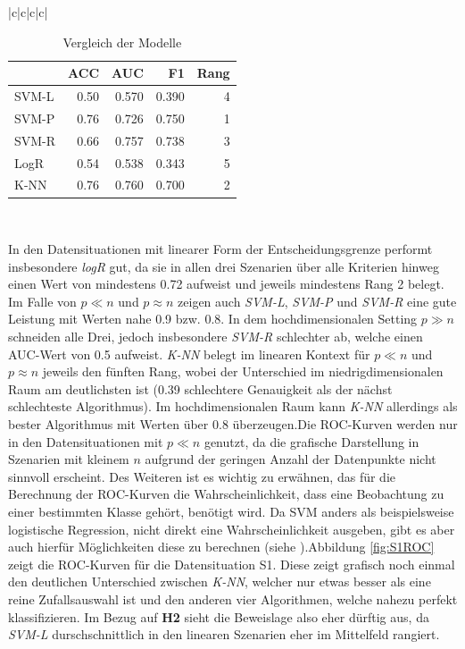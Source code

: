 \documentclass[
]{article}
\begin{document}
{\begin{landscape}
\begin{table}[h]
\begin{tabular}{|c|c|c|c|}
\begin{tabular}{lrrrr}
\toprule
  & ACC & AUC & F1 & Rang\\
\midrule
SVM-L & 0.50 & 0.570 & 0.390 & 4\\
SVM-P & 0.76 & 0.726 & 0.750 & 1\\
SVM-R & 0.66 & 0.757 & 0.738 & 3\\
LogR & 0.54 & 0.538 & 0.343 & 5\\
K-NN & 0.76 & 0.760 & 0.700 & 2\\
\bottomrule
\end{tabular}  \\ \hline \end{tabular} \caption{Vergleich der Modelle} \label{tab:TabVergleich} \end{table}

\end{landscape}
\clearpage
} \newline In den Datensituationen mit linearer Form der
Entscheidungsgrenze performt insbesondere \textit{logR} gut, da sie in
allen drei Szenarien über alle Kriterien hinweg einen Wert von
mindestens 0.72 aufweist und jeweils mindestens Rang 2 belegt. Im Falle
von \(p \ll n\) und \(p \approx n\) zeigen auch \textit{SVM-L},
\textit{SVM-P} und \textit{SVM-R} eine gute Leistung mit Werten nahe 0.9
bzw. 0.8. In dem hochdimensionalen Setting \(p \gg n\) schneiden alle
Drei, jedoch insbesondere \textit{SVM-R} schlechter ab, welche einen
AUC-Wert von 0.5 aufweist. \textit{K-NN} belegt im linearen Kontext für
\(p \ll n\) und \(p \approx n\) jeweils den fünften Rang, wobei der
Unterschied im niedrigdimensionalen Raum am deutlichsten ist (0.39
schlechtere Genauigkeit als der nächst schlechteste Algorithmus). Im
hochdimensionalen Raum kann \textit{K-NN} allerdings als bester
Algorithmus mit Werten über 0.8 überzeugen.\newline Die ROC-Kurven
werden nur in den Datensituationen mit \(p \ll n\) genutzt, da die
grafische Darstellung in Szenarien mit kleinem \(n\) aufgrund der
geringen Anzahl der Datenpunkte nicht sinnvoll erscheint. Des Weiteren
ist es wichtig zu erwähnen, das für die Berechnung der ROC-Kurven die
Wahrscheinlichkeit, dass eine Beobachtung zu einer bestimmten Klasse
gehört, benötigt wird. Da SVM anders als beispielsweise logistische
Regression, nicht direkt eine Wahrscheinlichkeit ausgeben, gibt es aber
auch hierfür Möglichkeiten diese zu berechnen (siehe
\cite{plattProbabilisticOutputsSupport2000}).\newline Abbildung
\ref{fig:S1ROC} zeigt die ROC-Kurven für die Datensituation S1. Diese
zeigt grafisch noch einmal den deutlichen Unterschied zwischen
\textit{K-NN}, welcher nur etwas besser als eine reine Zufallsauswahl
ist und den anderen vier Algorithmen, welche nahezu perfekt
klassifizieren. Im Bezug auf \textbf{H2} sieht die Beweislage also eher
dürftig aus, da \textit{SVM-L} durschschnittlich in den linearen
Szenarien eher im Mittelfeld rangiert.
\end{document}
